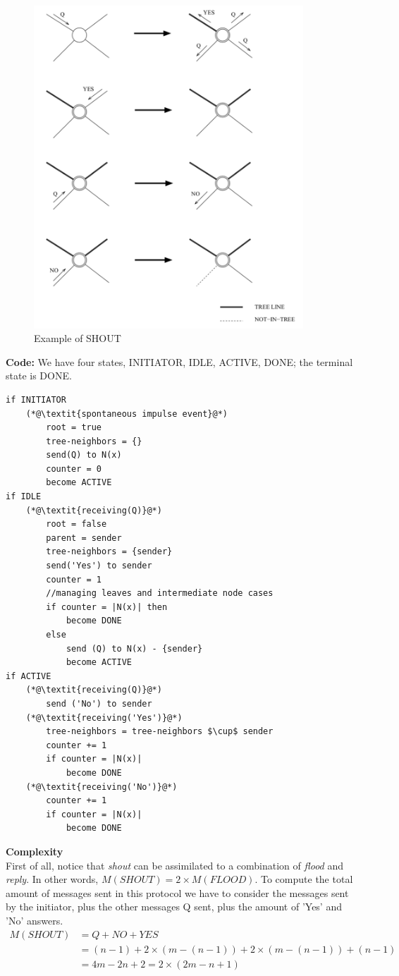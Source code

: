 \documentclass[paper=a4, fontsize=11pt]{scrartcl} %
\numberwithin{equation}{section} %
\numberwithin{figure}{section} %
\numberwithin{table}{section} %
\begin{document}
\begin{figure}[H]
  \centering
  \includegraphics[width=0.9\textwidth]{img/shout.png}
  \caption{Example of SHOUT}
  
\end{figure}
\newpage
\textbf{Code:} We have four states, INITIATOR, IDLE, ACTIVE, DONE; the terminal state is DONE.
\begin{lstlisting}
if INITIATOR
	(*@\textit{spontaneous impulse event}@*)
		root = true
		tree-neighbors = {}
		send(Q) to N(x)
		counter = 0
		become ACTIVE
if IDLE
	(*@\textit{receiving(Q)}@*)
		root = false
		parent = sender
		tree-neighbors = {sender}
		send('Yes') to sender
		counter = 1
		//managing leaves and intermediate node cases
		if counter = |N(x)| then
			become DONE
		else
			send (Q) to N(x) - {sender}
			become ACTIVE			 
if ACTIVE
	(*@\textit{receiving(Q)}@*)
		send ('No') to sender
	(*@\textit{receiving('Yes')}@*)
		tree-neighbors = tree-neighbors $\cup$ sender
		counter += 1
		if counter = |N(x)|
			become DONE
	(*@\textit{receiving('No')}@*)
		counter += 1
		if counter = |N(x)|
			become DONE			
\end{lstlisting}
\textbf{Complexity} \\
First of all, notice that \textit{shout} can be assimilated to a combination of \textit{flood} and \textit{reply}. In other words, $M(SHOUT) = 2	\times M(FLOOD)$.
To compute the total amount of messages sent in this protocol we have to consider the messages sent by the initiator, plus the other messages Q sent, plus the amount of 'Yes' and 'No' answers.
\begin{align*}
	M(SHOUT) &= Q + NO  + YES \\ 
	&= (n-1)+ 2\times(m-(n-1)) + 2\times(m-(n-1)) + (n-1) \\
	&= 4m - 2n + 2 = 2\times(2m-n+1)
\end{align*}
\end{document}
